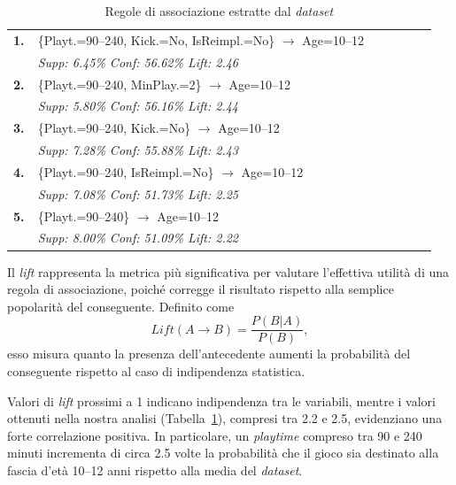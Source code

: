 \documentclass[10pt,twocolumn]{article}
\begin{document}
\begin{table}[ht!]
    \centering
    \footnotesize
    \renewcommand{\arraystretch}{1.2}
    \caption{Regole di associazione estratte dal \textit{dataset}}
    \label{tab:rules_agerec}
    \begin{tabular}{@{} p{0.05\linewidth} p{0.9\linewidth} @{}} 
        \hline
        \textbf{1.} & \{Playt.=90--240, Kick.=No, IsReimpl.=No\} $\to$ Age=10--12 \\
         & \textit{Supp: 6.45\% \quad Conf: 56.62\% \quad Lift: 2.46} \\ 
        \hline
        \textbf{2.} & \{Playt.=90--240, MinPlay.=2\} $\to$ Age=10--12 \\
         & \textit{Supp: 5.80\% \quad Conf: 56.16\% \quad Lift: 2.44} \\ 
        \hline
        \textbf{3.} & \{Playt.=90--240, Kick.=No\} $\to$ Age=10--12 \\
         & \textit{Supp: 7.28\% \quad Conf: 55.88\% \quad Lift: 2.43} \\ 
        \hline
        \textbf{4.} & \{Playt.=90--240, IsReimpl.=No\} $\to$ Age=10--12 \\
         & \textit{Supp: 7.08\% \quad Conf: 51.73\% \quad Lift: 2.25} \\ 
        \hline
        \textbf{5.} & \{Playt.=90--240\} $\to$ Age=10--12 \\
         & \textit{Supp: 8.00\% \quad Conf: 51.09\% \quad Lift: 2.22} \\ 
        \hline  
    \end{tabular}
\end{table}

Il \textit{lift} rappresenta la metrica più significativa per valutare l’effettiva utilità di una regola di associazione, poiché corregge il risultato rispetto alla semplice popolarità del conseguente. Definito come
\[
Lift(A \to B) = \frac{P(B|A)}{P(B)},
\]
esso misura quanto la presenza dell’antecedente aumenti la probabilità del conseguente rispetto al caso di indipendenza statistica.

Valori di \textit{lift} prossimi a 1 indicano indipendenza tra le variabili, mentre i valori ottenuti nella nostra analisi (Tabella~\ref{tab:rules_agerec}), compresi tra 2.2 e 2.5, evidenziano una forte correlazione positiva. In particolare, un \textit{playtime} compreso tra 90 e 240 minuti incrementa di circa 2.5 volte la probabilità che il gioco sia destinato alla fascia d’età 10--12 anni rispetto alla media del \textit{dataset}.
\end{document}
